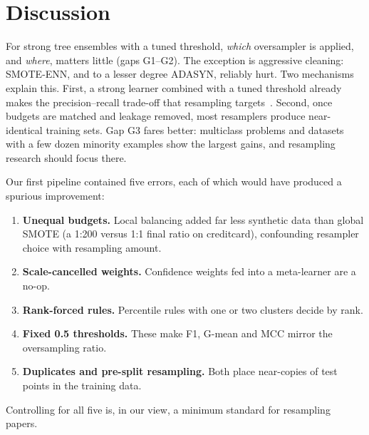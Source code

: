 \section{Discussion}\label{sec:discussion}

For strong tree ensembles with a tuned threshold, \emph{which} oversampler is applied, and \emph{where}, matters
little (gaps G1--G2). The exception is aggressive cleaning: SMOTE-ENN, and to a lesser degree ADASYN, reliably hurt.
Two mechanisms explain this. First, a strong learner combined with a tuned threshold already makes the
precision--recall trade-off that resampling targets~\cite{elor2022smote,vandengoorbergh2022harm}. Second, once
budgets are matched and leakage removed, most resamplers produce near-identical training sets. Gap G3 fares better:
multiclass problems and datasets with a few dozen minority examples show the largest gains, and resampling research
should focus there.

Our first pipeline contained five errors, each of which would have produced a spurious improvement:
\begin{enumerate}
  \item \textbf{Unequal budgets.} Local balancing added far less synthetic data than global SMOTE (a 1:200 versus
        1:1 final ratio on creditcard), confounding resampler choice with resampling amount.
  \item \textbf{Scale-cancelled weights.} Confidence weights fed into a meta-learner are a no-op.
  \item \textbf{Rank-forced rules.} Percentile rules with one or two clusters decide by rank.
  \item \textbf{Fixed 0.5 thresholds.} These make F1, G-mean and MCC mirror the oversampling ratio.
  \item \textbf{Duplicates and pre-split resampling.} Both place near-copies of test points in the training data.
\end{enumerate}
Controlling for all five is, in our view, a minimum standard for resampling papers.

